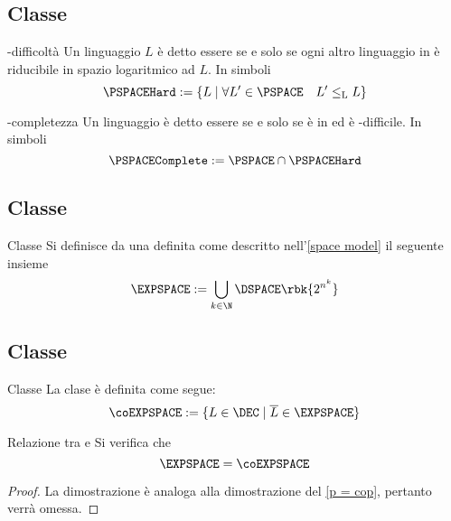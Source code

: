 \documentclass[a4paper, 12pt]{report}
\begin{document}
    \subsection{Classe \PSPACEComplete}

    \begin{frameddefn}{\PSPACE-difficoltà}
        Un linguaggio $L$ è detto essere  se e solo se ogni altro linguaggio in \PSPACE è riducibile in spazio logaritmico ad $L$. In simboli $$\PSPACEHard := \{L \mid \forall L' \in \PSPACE \quad L' \leq_\mathrm L L\}$$
    \end{frameddefn}

    \begin{frameddefn}{\PSPACE-completezza}
        Un linguaggio è detto essere  se e solo se è in \PSPACE ed è \PSPACE-difficile. In simboli $$\PSPACEComplete := \PSPACE \cap \PSPACEHard$$
    \end{frameddefn}

    \subsection{Classe \EXPSPACE}

    \begin{frameddefn}{Classe \EXPSPACE}
        Si definisce  da una \TM definita come descritto nell'\cref{space model} il seguente insieme $$\EXPSPACE := \displaystyle \bigcup_{k \in \N}{\DSPACE \rbk{2^{n^k}}}$$
    \end{frameddefn}

    \subsection{Classe \coEXPSPACE}

    \begin{frameddefn}{Classe \coEXPSPACE}
        La clase \coEXPSPACE è definita come segue: $$\coEXPSPACE := \{L \in \DEC \mid \overline L \in \EXPSPACE\}$$
    \end{frameddefn}

    \begin{framedthm}{Relazione tra \EXPSPACE e \coEXPSPACE}
        Si verifica che $$\EXPSPACE = \coEXPSPACE$$
    \end{framedthm}

    \begin{proof}
        La dimostrazione è analoga alla dimostrazione del \cref{p = cop}, pertanto verrà omessa.
    \end{proof}
\end{document}
